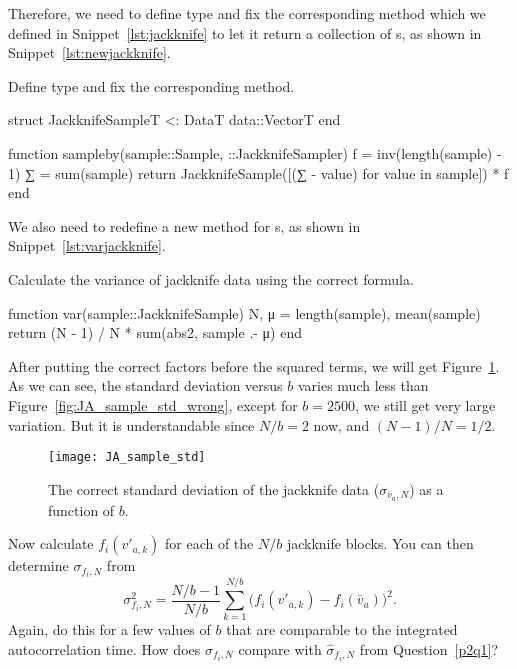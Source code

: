 Therefore, we need to define type  and fix the corresponding
 method which we defined in Snippet~\ref{lst:jackknife} to let it return
a collection of s,
as shown in Snippet~\ref{lst:newjackknife}.
%
\begin{algorithm}
    \caption{Define type  and fix the corresponding
         method.}
    \label{lst:newjackknife}
    \begin{juliacode}
        struct JackknifeSample{T} <: Data{T}
            data::Vector{T}
        end

        function sampleby(sample::Sample, ::JackknifeSampler)
            f = inv(length(sample) - 1)
            ∑ = sum(sample)
            return JackknifeSample([(∑ - value) for value in sample]) * f
        end
    \end{juliacode}
\end{algorithm}
%
We also need to redefine a new  method for s,
as shown in Snippet~\ref{lst:varjackknife}.
%
\begin{algorithm}
    \caption{Calculate the variance of jackknife data using the correct formula.}
    \label{lst:varjackknife}
    \begin{juliacode}
        function var(sample::JackknifeSample)
            N, μ = length(sample), mean(sample)
            return (N - 1) / N * sum(abs2, sample .- μ)
        end
    \end{juliacode}
\end{algorithm}

After putting the correct factors before the squared terms, we will get
Figure~\ref{fig:JA_sample_std}.
As we can see, the standard deviation versus \(b\) varies much less than
Figure~\ref{fig:JA_sample_std_wrong}, except for \(b = 2500\), we still get very large
variation. But it is understandable since \(N/b = 2\) now, and \((N - 1) / N = 1/2\).
%
\begin{figure}[H]
    \centering
    \texttt{[image: JA\_sample\_std]}
    \caption{The correct standard deviation of the jackknife data (\(\sigma_{\bar{v}_a,N}\)) as a
        function of \(b\).}
    \label{fig:JA_sample_std}
\end{figure}


\Question{} Now calculate \(f_i(v'_{a,k})\) for each of the \(N/b\) jackknife blocks.
You can then determine \(\sigma_{f_i,N}\) from
%
\begin{equation}\label{eq:sigmaf}
    \sigma^2_{f_i,N} = \frac{ N/b - 1 }{ N/b }
    \sum_{k=1}^{N/b} \bigl( f_i(v'_{a,k}) - f_i(\bar{v}_a) \bigr)^2.
\end{equation}
%
Again, do this for a few values of \(b\) that are comparable to the integrated
autocorrelation time. How does \(\sigma_{f_i,N}\) compare with \(\hat{\sigma}_{f_i,N}\) from
Question~\ref{p2q1}?

